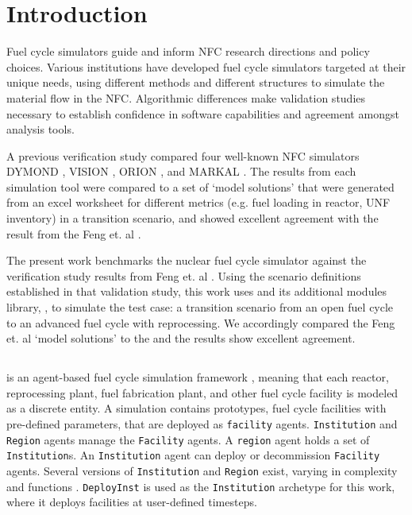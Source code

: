 
\section{Introduction}
Fuel cycle simulators guide and inform \gls{NFC} research directions and policy choices.
Various institutions have developed fuel cycle simulators targeted at their unique needs,
using different methods and different structures
to simulate the material flow in the \gls{NFC}.
Algorithmic differences make
validation studies necessary to establish
confidence in software capabilities and
agreement amongst analysis tools.

A previous verification study \cite{feng_standardized_2016} compared
four well-known \gls{NFC} simulators
DYMOND \cite{yacout_modeling_2005},
VISION \cite{jacobson_verifiable_2010},
ORION \cite{gregg_analysis_2012}, and
MARKAL \cite{shay_epa_2006}. The results from each simulation tool
were compared to a set of `model solutions' that were generated
from an excel worksheet for different metrics (e.g. fuel loading in reactor,
\gls{UNF} inventory) in a transition scenario, and showed excellent agreement
with the result from the Feng et. al \cite{feng_standardized_2016}.

The present work benchmarks the \Cyclus nuclear fuel cycle simulator 
\cite{huff_fundamental_2014}
against the verification study results from Feng et. al 
\cite{feng_standardized_2016}.
Using the scenario definitions established in that validation study,
this work uses \Cyclus and its additional modules library, \Cycamore, to simulate the test case: a transition scenario from an
open fuel cycle to an advanced fuel cycle with
reprocessing. We accordingly compared the Feng et. al `model solutions'
to the \Cyclus and the results show excellent agreement.


\subsection{\Cyclus}

\Cyclus is an agent-based fuel cycle simulation framework 
\cite{huff_fundamental_2016}, meaning 
that each reactor, reprocessing plant, fuel fabrication plant, and other fuel cycle
facility is modeled as a discrete entity.
A \Cyclus simulation contains prototypes, fuel cycle facilities with
pre-defined parameters, that are deployed as \texttt{facility} agents.
\texttt{Institution} and \texttt{Region} agents manage the \texttt{Facility} agents.
A \texttt{region} agent holds a set of \texttt{Institution}s.
An \texttt{Institution} agent can deploy or decommission \texttt{Facility} agents.
Several versions of \texttt{Institution}
and \texttt{Region} exist, varying in complexity and functions \cite{huff_extensions_2014}.
 \texttt{DeployInst} is used as the \texttt{Institution} archetype for this work, where it
deploys facilities at user-defined timesteps.
